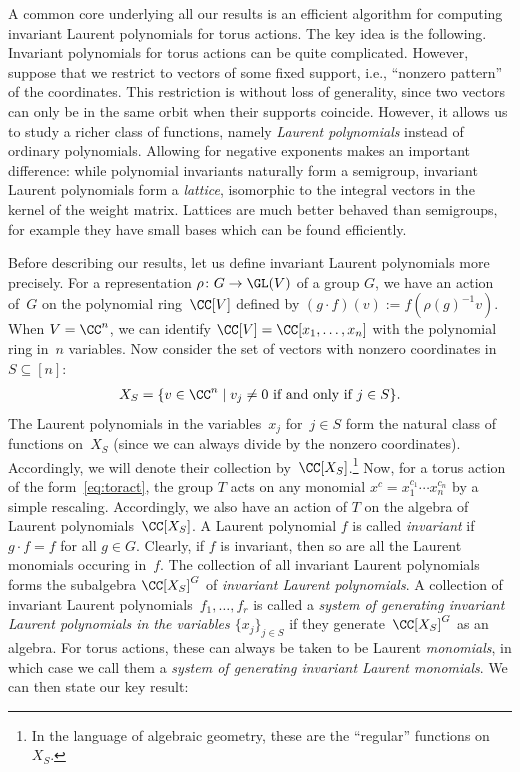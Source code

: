A common core underlying all our results is an efficient algorithm for computing invariant Laurent polynomials for torus actions.
The key idea is the following.
Invariant polynomials for torus actions can be quite complicated.
However, suppose that we restrict to vectors of some fixed support, i.e., ``nonzero pattern'' of the coordinates.
This restriction is without loss of generality, since two vectors can only be in the same orbit when their supports coincide.
However, it allows us to study a richer class of functions, namely \emph{Laurent polynomials} instead of ordinary polynomials.
Allowing for negative exponents makes an important difference:
while polynomial invariants naturally form a semigroup, invariant Laurent polynomials form a \emph{lattice}, isomorphic to the integral vectors in the kernel of the weight matrix.
Lattices are much better behaved than semigroups, for example they have small bases which can be found efficiently.

Before describing our results, let us define invariant Laurent polynomials more precisely.
For a representation $\rho\colon G \rightarrow \GL(V)$ of a group $G$, we have an action of~$G$ on the polynomial ring~$\CC[V]$
defined by $(g \cdot f) (v) := f(\rho(g)^{-1}v)$.
When $V=\CC^n$, we can identify $\CC[V]=\CC[x_1,\dots,x_n]$ with the polynomial ring in~$n$ variables.
Now consider the set of vectors with nonzero coordinates in~$S\subseteq[n]$:
\begin{align*}
  X_S = \{ v \in \CC^n \;|\; v_j \neq 0 \text{ if and only if } j \in S \}.
\end{align*}
The Laurent polynomials in the variables~$x_j$ for~$j \in S$ form the natural class of functions on~$X_S$ (since we can always divide by the nonzero coordinates).
Accordingly, we will denote their collection by~$\CC[X_S]$.\footnote{In the language of algebraic geometry, these are the ``regular'' functions on~$X_S$.}
Now, for a torus action of the form~\eqref{eq:toract}, the group $T$ acts on any monomial $x^c=x_1^{c_1} \cdots x_n^{c_n}$ by a simple rescaling.
Accordingly, we also have an action of $T$ on the algebra of Laurent polynomials~$\CC[X_S]$.
A Laurent polynomial $f$ is called \emph{invariant} if $g \cdot f = f$ for all $g \in G$.
Clearly, if $f$ is invariant, then so are all the Laurent monomials occuring in~$f$.
The collection of all invariant Laurent polynomials forms the subalgebra $\CC[X_S]^G$ of \emph{invariant Laurent polynomials}.
A collection of invariant Laurent polynomials~$f_1,\dots,f_r$ is called
a \emph{system of generating invariant Laurent polynomials in the variables $\{x_j\}_{j\in S}$}
if they generate~$\CC[X_S]^G$ as an algebra.
For torus actions, these can always be taken to be Laurent \emph{monomials}, in which case we call them a \emph{system of generating invariant Laurent monomials}.
We can then state our key result:

